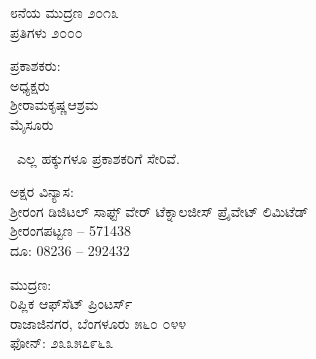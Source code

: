 \thispagestyle{empty}
\begin{flushleft}
{\fontsize{10}{12.5}\selectfont
೮ನೆಯ ಮುದ್ರಣ ೨೦೧೩\\
ಪ್ರತಿಗಳು ೨೦೦೦
\vfill

ಪ್ರಕಾಶಕರು:\\
ಅಧ್ಯಕ್ಷರು\\
ಶ್ರೀರಾಮಕೃಷ್ಣಆಶ್ರಮ\\
ಮೈಸೂರು
\vfill

\eng{\copyright}\ ಎಲ್ಲ ಹಕ್ಕುಗಳೂ ಪ್ರಕಾಶಕರಿಗೆ ಸೇರಿವೆ.
\vfill

ಅಕ್ಷರ ವಿನ್ಯಾಸ:\\ಶ‍್ರೀರಂಗ ಡಿಜಿಟಲ್ ಸಾಫ್ಟ್ ‍ವೇರ್ ಟೆಕ್ನಾಲಜೀಸ್ ಪ್ರೈವೇಟ್ ಲಿಮಿಟೆಡ್\\ಶ‍್ರೀರಂಗಪಟ್ಟಣ – 571438\\ದೂ: 08236 – 292432
\vfill

ಮುದ್ರಣ:\\
ರಿಪ್ಲಿಕ ಆಫ್​ಸೆಟ್ ಪ್ರಿಂಟರ್ಸ್\\
ರಾಜಾಜಿನಗರ, ಬೆಂಗಳೂರು ೫೬೦ ೦೪೪\\
ಫೋನ್: ೨೩೩೫೭೯೬೩
}
\end{flushleft}

